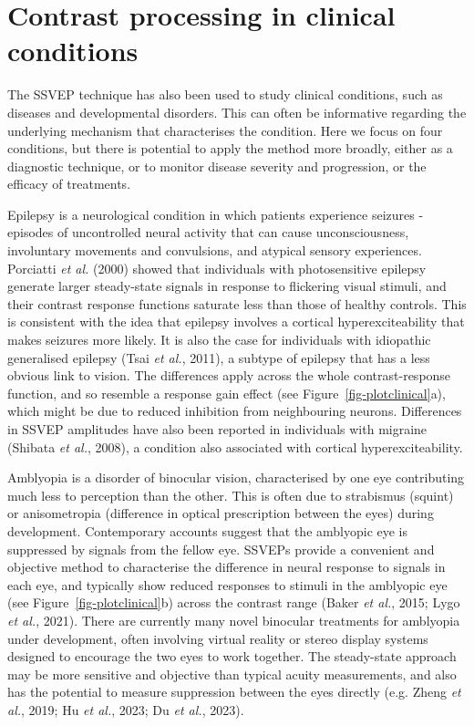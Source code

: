 \documentclass[
  letterpaper,
  DIV=11,
  numbers=noendperiod]{scrartcl}
\begin{document}
\section{Contrast processing in clinical
conditions}\label{contrast-processing-in-clinical-conditions}

The SSVEP technique has also been used to study clinical conditions,
such as diseases and developmental disorders. This can often be
informative regarding the underlying mechanism that characterises the
condition. Here we focus on four conditions, but there is potential to
apply the method more broadly, either as a diagnostic technique, or to
monitor disease severity and progression, or the efficacy of treatments.

Epilepsy is a neurological condition in which patients experience
seizures - episodes of uncontrolled neural activity that can cause
unconsciousness, involuntary movements and convulsions, and atypical
sensory experiences. Porciatti \emph{et al.} (2000) showed that
individuals with photosensitive epilepsy generate larger steady-state
signals in response to flickering visual stimuli, and their contrast
response functions saturate less than those of healthy controls. This is
consistent with the idea that epilepsy involves a cortical
hyperexciteability that makes seizures more likely. It is also the case
for individuals with idiopathic generalised epilepsy (Tsai \emph{et
al.}, 2011), a subtype of epilepsy that has a less obvious link to
vision. The differences apply across the whole contrast-response
function, and so resemble a response gain effect (see
Figure~\ref{fig-plotclinical}a), which might be due to reduced
inhibition from neighbouring neurons. Differences in SSVEP amplitudes
have also been reported in individuals with migraine (Shibata \emph{et
al.}, 2008), a condition also associated with cortical
hyperexciteability.

Amblyopia is a disorder of binocular vision, characterised by one eye
contributing much less to perception than the other. This is often due
to strabismus (squint) or anisometropia (difference in optical
prescription between the eyes) during development. Contemporary accounts
suggest that the amblyopic eye is suppressed by signals from the fellow
eye. SSVEPs provide a convenient and objective method to characterise
the difference in neural response to signals in each eye, and typically
show reduced responses to stimuli in the amblyopic eye (see
Figure~\ref{fig-plotclinical}b) across the contrast range (Baker
\emph{et al.}, 2015; Lygo \emph{et al.}, 2021). There are currently many
novel binocular treatments for amblyopia under development, often
involving virtual reality or stereo display systems designed to
encourage the two eyes to work together. The steady-state approach may
be more sensitive and objective than typical acuity measurements, and
also has the potential to measure suppression between the eyes directly
(e.g. Zheng \emph{et al.}, 2019; Hu \emph{et al.}, 2023; Du \emph{et
al.}, 2023).
\end{document}

